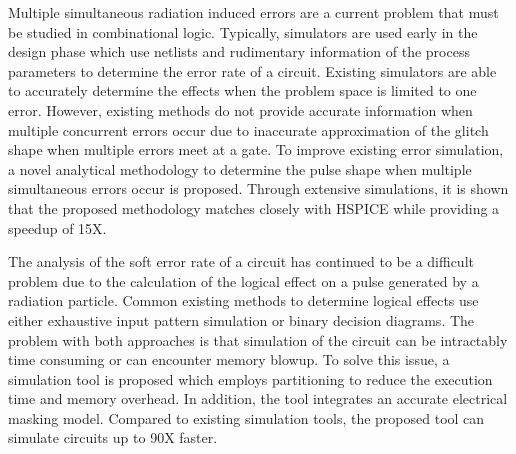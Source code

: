 Multiple simultaneous radiation induced errors are a current problem that must be studied in combinational logic. Typically, simulators are used early in the design phase which use netlists and rudimentary information of the process parameters to determine the error rate of a circuit. Existing simulators are able to accurately determine the effects when the problem space is limited to one error. However, existing methods do not provide accurate information when multiple concurrent errors occur due to inaccurate approximation of the glitch shape when multiple errors meet at a gate. To improve existing error simulation, a novel analytical methodology to determine the pulse shape when multiple simultaneous errors occur is proposed. Through extensive simulations, it is shown that the proposed methodology matches closely with HSPICE while providing a speedup of 15X.

The analysis of the soft error rate of a circuit has continued to be a difficult problem due to the calculation of the logical effect on a pulse generated by a radiation particle. Common existing methods to determine logical effects use either exhaustive input pattern simulation or binary decision diagrams. The problem with both approaches is that simulation of the circuit can be intractably time consuming or can encounter memory blowup. To solve this issue, a simulation tool is proposed which employs partitioning to reduce the execution time and memory overhead. In addition, the tool integrates an accurate electrical masking model. Compared to existing simulation tools, the proposed tool can simulate circuits up to 90X faster.

\newpage

